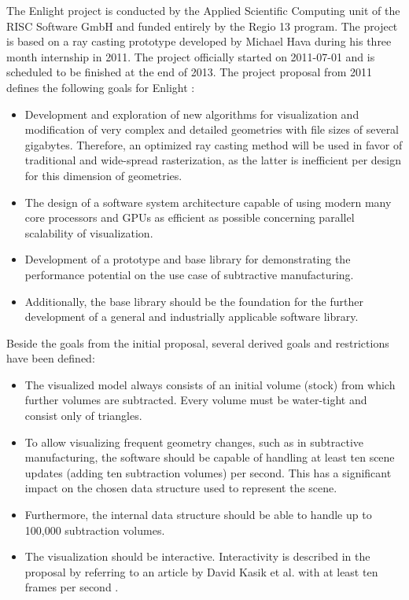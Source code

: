 The Enlight project is conducted by the Applied Scientific Computing unit of the RISC Software GmbH and funded entirely by the Regio 13 program. The project is based on a ray casting prototype developed by Michael Hava during his three month internship \cite{bakk_michael_hava} in 2011. The project officially started on 2011-07-01 and is scheduled to be finished at the end of 2013.
The project proposal from 2011 defines the following goals for Enlight \cite{enlight_proposal} :

\begin{itemize}
	\item Development and exploration of new algorithms for visualization and modification of very complex and detailed geometries with file sizes of several gigabytes. Therefore, an optimized ray casting method will be used in favor of traditional and wide-spread rasterization, as the latter is inefficient per design for this dimension of geometries.
	\item The design of a software system architecture capable of using modern many core processors and GPUs as efficient as possible concerning parallel scalability of visualization.
	\item Development of a prototype and base library for demonstrating the performance potential on the use case of subtractive manufacturing.
	\item Additionally, the base library should be the foundation for the further development of a general and industrially applicable software library.
\end{itemize}

Beside the goals from the initial proposal, several derived goals and restrictions have been defined:

\begin{itemize}
	\item The visualized model always consists of an initial volume (stock) from which further volumes are subtracted. Every volume must be water-tight and consist only of triangles.
	\item To allow visualizing frequent geometry changes, such as in subtractive manufacturing, the software should be capable of handling at least ten scene updates (adding ten subtraction volumes) per second. This has a significant impact on the chosen data structure used to represent the scene.
	\item Furthermore, the internal data structure should be able to handle up to 100,000 subtraction volumes.
	\item The visualization should be interactive. Interactivity is described in the proposal by referring to an article by David Kasik et al. with at least ten frames per second \cite{interactive_framerate}.
\end{itemize}

